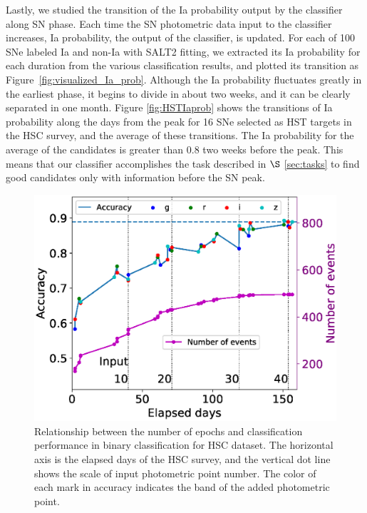 \documentclass[useamsfonts]{pasj01}
\begin{document}
Lastly, we studied the transition of the Ia probability output by the classifier along SN phase.
Each time the SN photometric data input to the classifier increases, Ia probability, the output of the classifier, is updated.
For each of 100 SNe labeled Ia and non-Ia with SALT2 fitting, we extracted its Ia probability for each duration from the various classification results, and plotted its transition as Figure\ \ref{fig:visualized_Ia_prob}.
Although the Ia probability fluctuates greatly in the earliest phase, it begins to divide in about two weeks, and it can be clearly separated in one month.
Figure \ref{fig:HSTIaprob} shows the transitions of Ia probability along the days from the peak for 16 SNe selected as HST targets in the HSC survey, and the average of these transitions.
The Ia probability for the average of the candidates is greater than 0.8 two weeks before the peak.
This means that our classifier accomplishes the task described in $\S$ \ref{sec:tasks} to find good candidates only with information before the SN peak.
%
\begin{figure}[htbp]
  \begin{center}
     \includegraphics[width=\columnwidth]{figures/n_observations_v2.eps}
  \end{center}
  \caption{%
  Relationship between the number of epochs and classification performance in binary classification for HSC dataset. 
  The horizontal axis is the elapsed days of the HSC survey, and the vertical dot line shows the scale of input photometric point number. 
  The color of each mark in accuracy indicates the band of the added photometric point.
  }%
  \label{fig:n_observations}
\end{figure}
\end{document}
